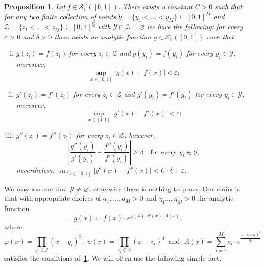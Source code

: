 \documentclass[11pt,]{article}
\def\cref#1{\ref{#1}}%
\newtheorem{proposition}[theorem]{Proposition}
\theoremstyle{definition}
\theoremstyle{remark}
\newcommand{\0}{\mathbf{0}}
\begin{document}
\begin{proposition}\label{prop:AnalyticBumpFunc}
Let $f\in \mathcal{S}^{\omega}_\epsilon([0,1])$. There exists a constant $C>0$ such that for
any two finite collection of points
$\mathcal{Y}=\{y_1<\ldots<y_M\}\subseteq[0,1]^M$ and $\mathcal{Z}=\{z_1<\ldots<
z_Q\}\subseteq[0,1]^Q$ with $\mathcal{Y}\cap\mathcal{Z}=\varnothing$ we have the following: for
every $\varepsilon>0$ and $\delta>0$ there exists an analytic function
$g\in\mathcal{S}^{\omega}_\epsilon([0,1])$ such that
\begin{enumerate}[(i)]
\item $g(z_i)=f(z_i)$ for every $z_i\in\mathcal{Z}$ and $g(y_i)=f(y_i)$ for every $y_i\in\mathcal{Y}$, moreover,
\begin{equation*}
\sup_{x\in[0,1]}|g(x)-f(x)|<\varepsilon;
\end{equation*}
\item  $g'(z_i)=f'(z_i)$ for every $z_i\in\mathcal{Z}$ and $g'(y_i)=f'(y_i)$ for every $y_i\in\mathcal{Y}$, moreover,
\begin{equation*}
	\sup_{x\in[0,1]}|g'(x)-f'(x)|<\varepsilon;
\end{equation*}
\item $g''(z_i)=f''(z_i)$ for every $z_i\in\mathcal{Z}$, however,
\begin{equation*}
	\left| \frac{g''(y_i)}{g'(y_i)} - \frac{f''(y_i)}{f'(y_i)} \right|\geq \delta \quad\text{
	for every } y_i\in\mathcal{Y},
\end{equation*}
nevertheless, $	\sup_{x\in[0,1]}|g''(x)-f''(x)|<C\cdot \delta +\varepsilon$.
\end{enumerate}
\end{proposition}

We may assume that $\mathcal{Y}\neq\varnothing$, otherwise there is nothing to prove. Our claim is
that with appropriate choices of $a_1,\ldots,a_M>0$ and $\eta_1\ldots,\eta_M>0$ the analytic
function
\begin{equation}\label{eq:BumpFunc}
g(x)\coloneqq f(x)\cdot e^{\varphi(x)\cdot \psi(x)\cdot A(x)},
\end{equation} 
where
\begin{equation*}
\varphi(x)=\prod_{y_i\in\mathcal{Y}} (x-y_i)^2,\; \psi(x) = \prod_{z_i\in\mathcal{Z}} (x-z_i)^4
\;\text{ and }\; A(x)= \sum_{i=1}^{M} a_i\cdot e^{\frac{-(x-y_i)^2}{\eta_i}}
\end{equation*}
satisfies the conditions of~\cref{prop:AnalyticBumpFunc}. We will often use the following simple fact.
\end{document}
